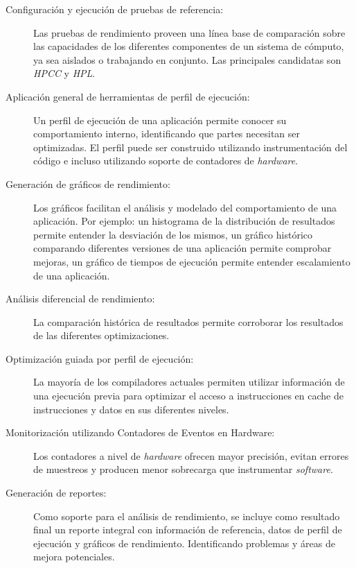 \documentclass[a4paper]{article}
\begin{document}
\begin{description}
\item[Configuración y ejecución de pruebas de referencia:]

Las pruebas de rendimiento proveen una línea base de comparación sobre las capacidades de los diferentes componentes de un sistema de cómputo, ya sea aislados o trabajando en conjunto. Las principales candidatas son {\it HPCC} y {\it HPL}.

\item[Aplicación general de herramientas de perfil de ejecución:]

Un perfil de ejecución de una aplicación permite conocer su comportamiento interno, identificando que partes necesitan ser optimizadas. El perfil puede ser construido utilizando instrumentación del código e incluso utilizando soporte de contadores de {\it hardware}.

\item[Generación de gráficos de rendimiento:]

Los gráficos facilitan el análisis y modelado del comportamiento de una aplicación. Por ejemplo: un histograma de la distribución de resultados permite entender la desviación de los mismos, un gráfico histórico comparando diferentes versiones de una aplicación permite comprobar mejoras, un gráfico de tiempos de ejecución permite entender escalamiento de una aplicación.

\item[Análisis diferencial de rendimiento:]

La comparación histórica de resultados permite corroborar los resultados de las diferentes optimizaciones.

\item[Optimización guiada por perfil de ejecución:]

La mayoría de los compiladores actuales permiten utilizar información de una ejecución previa para optimizar el acceso a instrucciones en cache de instrucciones y datos en sus diferentes niveles.

\item[Monitorización utilizando Contadores de Eventos en Hardware:]

Los contadores a nivel de {\it hardware} ofrecen mayor precisión, evitan errores de muestreos y producen menor sobrecarga que instrumentar {\it software}.

\item[Generación de reportes:]

Como soporte para el análisis de rendimiento, se incluye como resultado final un reporte integral con información de referencia, datos de perfil de ejecución y gráficos de rendimiento. Identificando problemas y áreas de mejora potenciales.

\end{description}
\end{document}
